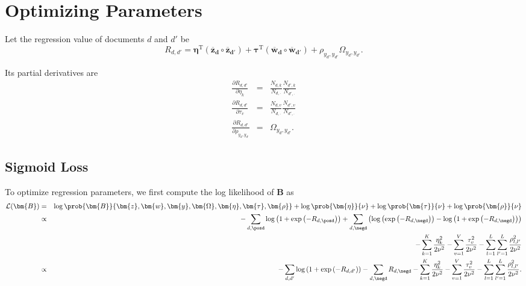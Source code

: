 \section{Optimizing Parameters}
\label{sec:optimize}

Let the regression value of documents $d$ and $d'$ be
\begin{equation}\label{equ:w_def}
R_{d,d'}=\bm{\eta}^\mathrm{T} (\bm{\overline{z}_d} \circ \bm{\overline{z}_{d'}}) + \bm{\tau}^\mathrm{T} (\bm{\overline{w}_d} \circ \bm{\overline{w}_{d'}}) + \rho_{y_d, y_{d'}} \Omega_{y_d,y_{d'}}.
\end{equation}

Its partial derivatives are
\begin{eqnarray}
\frac{\partial R_{d,d'}}{\partial \eta_k} &=& \frac {N_{d,k}} {N_{d,\cdot}} \frac {N_{d',k}} {N_{d',\cdot}}\\
\frac{\partial R_{d,d'}}{\partial \tau_v} &=& \frac {N_{d,v}} {N_{d,\cdot}} \frac {N_{d',v}} {N_{d',\cdot}}\\
\frac{\partial R_{d,d'}}{\partial \rho_{y_d, y_{d'}}} &=& \Omega_{y_d, y_{d'}}.
\end{eqnarray}

\subsection{Sigmoid Loss}
\label{subsec:sigmoid_opt}

To optimize regression parameters, we first compute the log likelihood of $\bm{B}$ as
\begin{eqnarray}
\mathcal{L}(\bm{B}) &=& \log \prob {\bm{B}} {\bm{z}, \bm{w}, \bm{y}, \bm{\Omega}, \bm{\eta}, \bm{\tau}, \bm{\rho}} + \log \prob {\bm{\eta}} {\nu} + \log \prob {\bm{\tau}} {\nu} +\log \prob {\bm{\rho}}{\nu}\\
&\propto& -\sum_{d,\posd} \log \left( 1 + \exp \left( -R_{d,\posd} \right) \right) + \sum_{d,\negd} \left( \log \left( \exp \left( -R_{d,\negd} \right) \right) - \log \left( 1 + \exp \left( -R_{d,\negd} \right) \right) \right) \notag\\
&&- \sum_{k=1}^{K} \frac {\eta_k^2} {2\nu^2} - \sum_{v=1}^{V} \frac {\tau_v^2} {2\nu^2} - \sum_{l=1}^{L} \sum_{l'=1}^{L} \frac {\rho_{l,l'}^2} {2\nu^2}\\
&\propto& -\sum_{d,d'} \log \left( 1 + \exp \left( -R_{d,d'} \right) \right) - \sum_{d,\negd} R_{d,\negd} - \sum_{k=1}^{K} \frac {\eta_k^2} {2\nu^2} - \sum_{v=1}^{V} \frac {\tau_v^2} {2\nu^2} - \sum_{l=1}^{L} \sum_{l'=1}^{L} \frac {\rho_{l,l'}^2} {2\nu^2}. \label{eq:sigmoid_likelihood}
\end{eqnarray}

